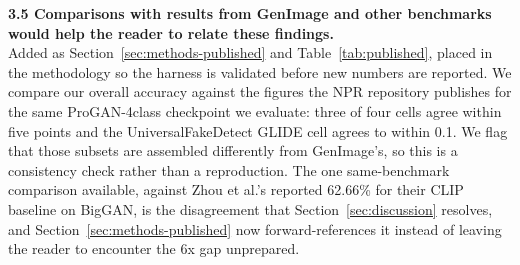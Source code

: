\documentclass[3p,times,procedia]{elsarticle}
\begin{document}
\noindent\textbf{3.5 Comparisons with results from GenImage and other
benchmarks would help the reader to relate these findings.}\\[1pt]
Added as Section~\ref{sec:methods-published} and Table~\ref{tab:published},
placed in the methodology so the harness is validated before new numbers
are reported. We compare our overall accuracy against the figures the NPR
repository publishes for the same ProGAN-4class checkpoint we evaluate:
three of four cells agree within five points and the UniversalFakeDetect
GLIDE cell agrees to within 0.1. We flag that those subsets are assembled
differently from GenImage's, so this is a consistency check rather than a
reproduction. The one same-benchmark comparison available, against Zhou et
al.'s reported 62.66\% for their CLIP baseline on BigGAN, is the
disagreement that Section~\ref{sec:discussion} resolves, and
Section~\ref{sec:methods-published} now forward-references it instead of
leaving the reader to encounter the 6x gap unprepared.
\end{document}
